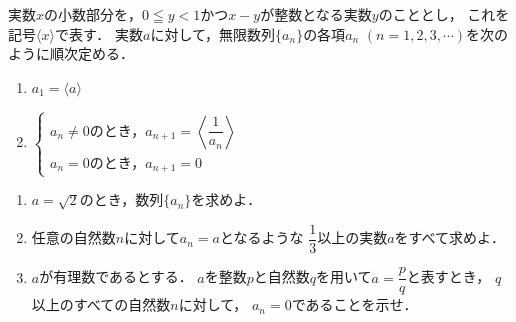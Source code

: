 \documentclass[../../main.tex]{subfiles}
\begin{document}
実数$x$の小数部分を，$0 \leqq y < 1$かつ$x-y$が整数となる実数$y$のこととし，
これを記号$\langle x \rangle$で表す．
実数$a$に対して，無限数列$\{ a_n \}$の各項$a_n$ $(n=1,2,3,\cdots)$を次のように順次定める．
\begin{enumerate}
  \item $a_1 = \langle a \rangle$
  \item $
    \begin{cases}
      a_n \neq 0 \text{のとき，} a_{n+1}= \left\langle\displaystyle\dfrac{1}{a_n}\right\rangle \\
      a_n = 0 \text{のとき，} a_{n+1} = 0
    \end{cases}$
\end{enumerate}
\begin{enumerate}
  \item $a=\sqrt2$のとき，数列$\{ a_n \}$を求めよ．
  \item 任意の自然数$n$に対して$a_n=a$となるような
    $\displaystyle\dfrac{1}{3}$以上の実数$a$をすべて求めよ．
  \item $a$が有理数であるとする．
    $a$を整数$p$と自然数$q$を用いて$a=\displaystyle\dfrac{p}{q}$と表すとき，
    $q$以上のすべての自然数$n$に対して，
    $a_n=0$であることを示せ．
\end{enumerate}
\end{document}
